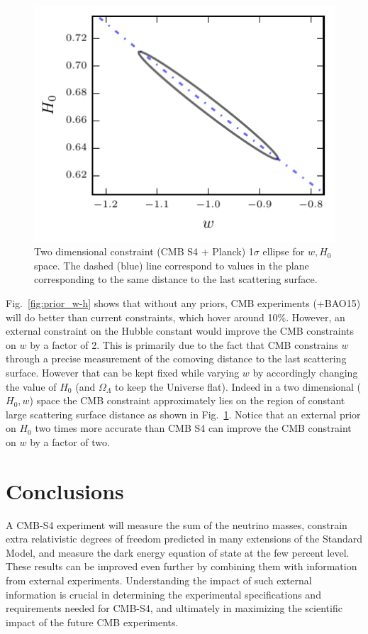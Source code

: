\documentclass[aps,prd,reprint,superscriptaddress,nofootinbib]{revtex4-1}
\newcommand{\reffig}[1]{Fig.~\ref{fig:#1}}
\begin{document}

\begin{figure}[htbp]
\begin{center}
\includegraphics{ellipse_H0_w.pdf}
\caption{Two dimensional constraint (CMB S4 + Planck) 1$\sigma$ ellipse for $w,H_{0}$ space. The dashed (blue) line correspond to values in the plane corresponding to the same distance to the last scattering surface.} 
\label{fig:ellipse_w_H0}
\end{center}
\end{figure}


\reffig{prior_w-h} shows that without any priors, CMB experiments (+BAO15) will do better than current constraints, which hover around 10\%. However, an external constraint on the Hubble constant would improve the CMB constraints on $w$ by a factor of 2. 
This is primarily due to the fact that CMB constrains $w$ through a precise measurement of the comoving distance to the last scattering surface. However that can be kept fixed while varying $w$ by accordingly changing the value of $H_{0}$ (and $\Omega_{\Lambda}$ to keep the Universe flat). Indeed in a two dimensional ($H_{0},w$) space the CMB constraint approximately lies on the region of constant large scattering surface distance as shown in \reffig{ellipse_w_H0}.
Notice that an external prior on $H_{0}$ two times more accurate than CMB S4 can improve the CMB constraint on $w$ by a factor of two.

\section{Conclusions \label{sec:conclusions}}
A CMB-S4 experiment will measure the sum of the neutrino masses, constrain extra relativistic degrees of freedom predicted in many extensions of the Standard Model, and measure the dark energy equation of state at the few percent level. 
These results can be improved even further by combining them with information from external experiments.
Understanding the impact of such external information is crucial in determining the experimental specifications and requirements needed for CMB-S4, and ultimately in maximizing the scientific impact of the future CMB experiments. 
\end{document}
